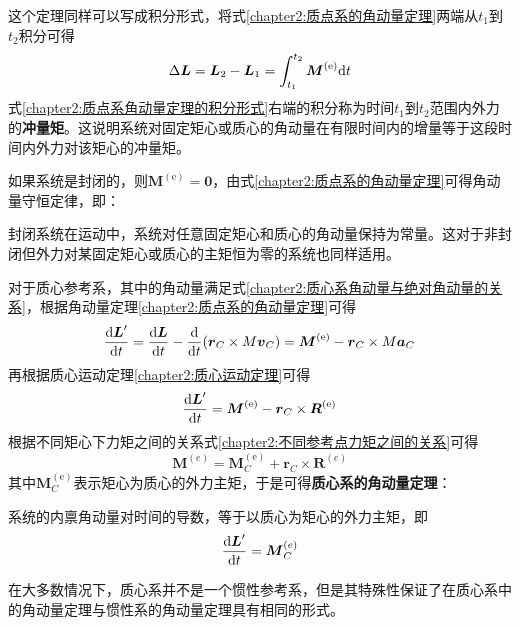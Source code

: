 这个定理同样可以写成积分形式，将式\eqref{chapter2:质点系的角动量定理}两端从$t_1$到$t_2$积分可得
\begin{equation}
	\Delta\boldsymbol{L} = \boldsymbol{L}_2 - \boldsymbol{L}_1 = \int_{t_1}^{t_2}\boldsymbol{M}^{(\mathrm{e})}\mathrm{d} t
	\label{chapter2:质点系角动量定理的积分形式}
\end{equation}
式\eqref{chapter2:质点系角动量定理的积分形式}右端的积分称为时间$t_1$到$t_2$范围内外力的{\bf 冲量矩}。这说明系统对固定矩心或质心的角动量在有限时间内的增量等于这段时间内外力对该矩心的冲量矩。

如果系统是封闭的，则$\boldsymbol{M}^{(\mathrm{e})} = \boldsymbol{0}$，由式\eqref{chapter2:质点系的角动量定理}可得角动量守恒定律，即：

\begin{theorem}[角动量守恒定律]
	封闭系统在运动中，系统对任意固定矩心和质心的角动量保持为常量。这对于非封闭但外力对某固定矩心或质心的主矩恒为零的系统也同样适用。
\end{theorem}

对于质心参考系，其中的角动量满足式\eqref{chapter2:质心系角动量与绝对角动量的关系}，根据角动量定理\eqref{chapter2:质点系的角动量定理}可得
\begin{align*}
	\dfrac{\mathrm{d} \boldsymbol{L}'}{\mathrm{d} t} = \dfrac{\mathrm{d} \boldsymbol{L}}{\mathrm{d} t} - \frac{\mathrm{d}}{\mathrm{d} t}(\boldsymbol{r}_C \times M\boldsymbol{v}_C) = \boldsymbol{M}^{(\mathrm{e})} - \boldsymbol{r}_C \times M\boldsymbol{a}_C
\end{align*}
再根据质心运动定理\ref{chapter2:质心运动定理}可得
\begin{equation}
	\dfrac{\mathrm{d} \boldsymbol{L}'}{\mathrm{d} t} = \boldsymbol{M}^{(\mathrm{e})} - \boldsymbol{r}_C \times \boldsymbol{R}^{(\mathrm{e})}
\end{equation}
根据不同矩心下力矩之间的关系式\eqref{chapter2:不同参考点力矩之间的关系}可得
\begin{equation}
	\boldsymbol{M}^{(e)} = \boldsymbol{M}_C^{(\mathrm{e})} + \boldsymbol{r}_C \times\boldsymbol{R}^{(e)}
\end{equation}
其中$\boldsymbol{M}_C^{(\mathrm{e})}$表示矩心为质心的外力主矩，于是可得{\bf 质心系的角动量定理}：

\begin{theorem}[质心系的角动量定理]
	系统的内禀角动量对时间的导数，等于以质心为矩心的外力主矩，即
	\begin{equation}
		\frac{\mathrm{d} \boldsymbol{L}'}{\mathrm{d} t} = \boldsymbol{M}_C^{(e)}
	\end{equation}
\end{theorem}
在大多数情况下，质心系并不是一个惯性参考系，但是其特殊性保证了在质心系中的角动量定理与惯性系的角动量定理具有相同的形式。

